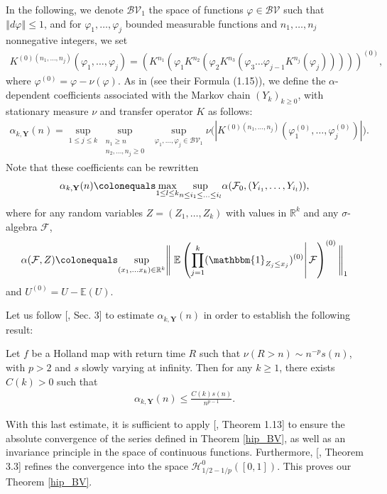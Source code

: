 \documentclass{ws-sd}
\newcommand{\E}{\mathbb{E}}
\newcommand{\condEp}[2]{\left.\E\left(#1\right\lvert #2 \right)}
\newcommand{\calF}{\mathcal{F}}
\newcommand{\indic}{\mathbbm{1}}
\newcommand{\norm}[1]{\left\Vert #1\right\Vert}
\newcommand{\abs}[1]{\left\lvert #1 \right\rvert}
\newcommand{\eqdef}{\colonequals}
\begin{document}
In the following, we denote $\mathcal{BV}_1$ the space of functions $\varphi \in \mathcal{BV}$ such that $\norm{d\varphi} \le 1$, and for $\varphi_1,\ldots,\varphi_j$ bounded measurable functions and $n_1,\ldots,n_j$ nonnegative integers, we set
\begin{align*}
    K^{(0)(n_1,\ldots,n_j)}(\varphi_1,\ldots,\varphi_j) = (K^{n_1}(\varphi_1K^{n_2}(\varphi_2K^{n_3}(\varphi_3\ldots \varphi_{j-1}K^{n_j}(\varphi_j)))))^{(0)},
\end{align*}
where $\varphi^{(0)} = \varphi - \nu(\varphi)$.
As in \cite{7} (see their Formula (1.15)), we define the $\alpha$-dependent coefficients associated with the Markov chain $(Y_k)_{k \ge 0}$, with stationary measure $\nu$ and transfer operator $K$ as follows:
   \begin{align}
       \alpha_{k, \mathbf{Y}}(n) = \underset{1 \le j \le k}{\sup} \underset{\substack{n_1 \ge n \\ n_2,\ldots,n_j \ge 0}}{\sup} ~\underset{\varphi_1,\ldots,\varphi_j \in \mathcal{BV}_1}{\sup} \nu \Big( \abs{ K^{(0)(n_1,\ldots,n_j)}(\varphi_1^{(0)},\ldots,\varphi_j^{(0)})} \Big).
   \end{align}
   Note that these coefficients can be rewritten
    \begin{align*}
        \alpha_{k,\mathbf{Y}}(n) \eqdef \underset{1\le l \le k}{\max} \underset{n \le i_1 \le \ldots\le i_l}{\sup} \alpha(\mathcal{F}_0,(Y_{i_1},\ldots,Y_{i_l})),
    \end{align*}
    where for any random variables $Z=(Z_1,\ldots,Z_k)$ with values in $\mathbb{R}^k$ and any $\sigma$-algebra $\mathcal{F}$,
    \begin{align*}
        \alpha(\mathcal{F},Z) \eqdef \underset{(x_1,\ldots x_k) \in \mathbb{R}^k}{\sup} \Bigg \lVert \condEp{ \prod_{j=1}^k (\indic_{Z_j \le x_j})^{(0)}}{\calF}^{(0)} \Bigg \rVert_1
    \end{align*}
    and $U^{(0)} = U - \E(U)$.

Let us follow [, Sec. 3] to estimate $\alpha_{k, \mathbf Y}(n)$ in order to establish the following result:
\begin{theorem}\label{Theorem_alpha}
    Let $f$ be a Holland map with return time $R$ such that $\nu(R > n) \sim n^{-p}s(n)$, with $p > 2$ and $s$ slowly varying at infinity.
    Then for any $k \ge 1$, there exists $C(k) > 0 $ such that
    \begin{align*}
        \alpha_{k, \mathbf Y}(n) \le \frac{C(k)s(n)}{n^{p-1}}.
    \end{align*}
\end{theorem}
With this last estimate, it is sufficient to apply [, Theorem 1.13] to ensure the absolute convergence of the series defined in Theorem \ref{hip_BV}, as well as an invariance principle in the space of continuous functions. Furthermore, [, Theorem 3.3] refines the convergence into the space $\mathcal H_{1/2-1/p}^0([0,1])$. This proves our Theorem \ref{hip_BV}.\\
\end{document}
